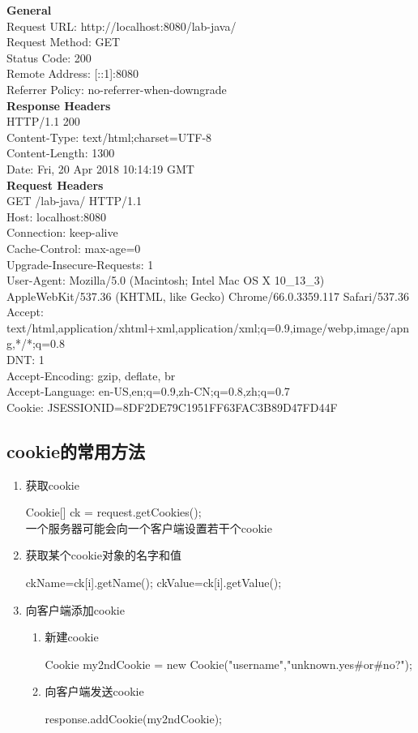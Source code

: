 \textbf{General}\\
Request URL: http://localhost:8080/lab-java/\\
Request Method: GET\\
Status Code: 200 \\
Remote Address: [::1]:8080\\
Referrer Policy: no-referrer-when-downgrade\\
\textbf{Response Headers}\\
HTTP/1.1 200\\
Content-Type: text/html;charset=UTF-8\\
Content-Length: 1300\\
Date: Fri, 20 Apr 2018 10:14:19 GMT\\
\textbf{Request Headers}\\
GET /lab-java/ HTTP/1.1\\
Host: localhost:8080\\
Connection: keep-alive\\
Cache-Control: max-age=0\\
Upgrade-Insecure-Requests: 1\\
User-Agent: Mozilla/5.0 (Macintosh; Intel Mac OS X 10\_13\_3) AppleWebKit/537.36 (KHTML, like Gecko) Chrome/66.0.3359.117 Safari/537.36\\
Accept: text/html,application/xhtml+xml,application/xml;q=0.9,image/webp,image/apng,*/*;q=0.8\\
DNT: 1\\
Accept-Encoding: gzip, deflate, br\\
Accept-Language: en-US,en;q=0.9,zh-CN;q=0.8,zh;q=0.7\\
Cookie: JSESSIONID=8DF2DE79C1951FF63FAC3B89D47FD44F\\
\subsection{cookie的常用方法}
\begin{enumerate}
\item
获取cookie

Cookie[] ck = request.getCookies();\\一个服务器可能会向一个客户端设置若干个cookie
\item
获取某个cookie对象的名字和值

ckName=ck[i].getName();
ckValue=ck[i].getValue();
\item
向客户端添加cookie
\begin{enumerate}
\item
新建cookie

Cookie my2ndCookie = new Cookie("username","unknown.yes\#or\#no?");
\item
向客户端发送cookie

response.addCookie(my2ndCookie);
\end{enumerate}

\end{enumerate}
